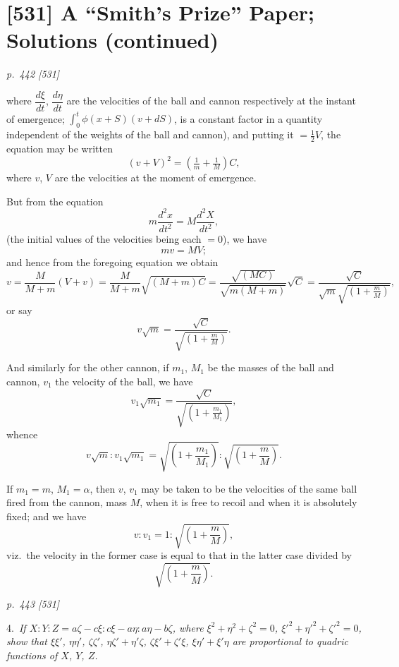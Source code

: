 \documentclass[11pt,a4paper]{book}
\begin{document}
\section*{[531] A ``Smith's Prize'' Paper; Solutions \textnormal{(continued)}}

\bigskip
\textit{p.~442 [531]}
\smallskip

\noindent
where $\dfrac{d\xi}{dt}$, $\dfrac{d\eta}{dt}$ are the velocities of the ball and cannon respectively at the instant of
emergence; $\int_0^t \phi(x+S)(v+dS)$, is a constant factor in a quantity independent of the weights of the ball and cannon), and putting it $=\tfrac{1}{2}V$, the equation may be written
\[
(v+V)^2 = \left(\tfrac{1}{m}+\tfrac{1}{M}\right)C,
\]
where $v$, $V$ are the velocities at the moment of emergence.

But from the equation
\[
m\frac{d^2x}{dt^2} = M\frac{d^2X}{dt^2},
\]
(the initial values of the velocities being each $=0$), we have
\[
mv = MV;
\]
and hence from the foregoing equation we obtain
\[
v = \frac{M}{M+m}(V+v) = \frac{M}{M+m}\sqrt{(M+m)C} = \frac{\sqrt{(MC)}}{\sqrt{m(M+m)}}\sqrt{C} = \frac{\sqrt{C}}{\sqrt{m}\sqrt{\left(1+\frac{m}{M}\right)}},
\]
or say
\[
v\sqrt{m} = \frac{\sqrt{C}}{\sqrt{\left(1+\frac{m}{M}\right)}}.
\]

And similarly for the other cannon, if $m_1$, $M_1$ be the masses of the ball and cannon,
$v_1$ the velocity of the ball, we have
\[
v_1 \sqrt{m_1} = \frac{\sqrt{C}}{\sqrt{\left(1+\frac{m_1}{M_1}\right)}},
\]
whence
\[
v\sqrt{m} : v_1 \sqrt{m_1} = \sqrt{\left(1+\frac{m_1}{M_1}\right)} : \sqrt{\left(1+\frac{m}{M}\right)}.
\]

If $m_1 = m$, $M_1 = \alpha$, then $v$, $v_1$ may be taken to be the velocities of the same ball fired
from the cannon, mass $M$, when it is free to recoil and when it is absolutely fixed;
and we have
\[
v : v_1 = 1 : \sqrt{\left(1+\frac{m}{M}\right)},
\]
viz.\ the velocity in the former case is equal to that in the latter case divided by
\[
\sqrt{\left(1+\frac{m}{M}\right)}.
\]

\clearpage

\bigskip
\textit{p.~443 [531]}
\smallskip

4.\ \textit{If $X : Y : Z = a\zeta - c\xi : c\xi - a\eta : a\eta - b\zeta$, where $\xi^2 + \eta^2 + \zeta^2 = 0$, $\xi'^2 + \eta'^2 + \zeta'^2 = 0$, show that $\xi\xi'$, $\eta\eta'$, $\zeta\zeta'$, $\eta\zeta' + \eta'\zeta$, $\zeta\xi' + \zeta'\xi$, $\xi\eta' + \xi'\eta$ are proportional to quadric functions of $X$, $Y$, $Z$.}
\end{document}
